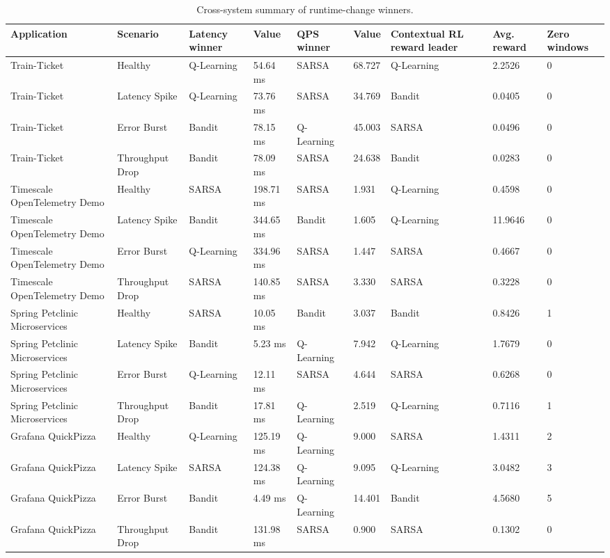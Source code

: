 \documentclass[10pt,twocolumn]{article}
\begin{document}
\begin{table}[t]
\centering
\small
\caption{Cross-system summary of runtime-change winners.}
\begin{tabularx}{\textwidth}{p{2.4cm}p{1.6cm}p{1.8cm}p{1.2cm}p{1.8cm}p{1.0cm}p{2.1cm}p{1.0cm}p{1.0cm}}
\toprule
Application & Scenario & Latency winner & Value & QPS winner & Value & Contextual RL reward leader & Avg. reward & Zero windows \\
\midrule

Train-Ticket & Healthy & Q-Learning & 54.64 ms & SARSA & 68.727 & Q-Learning & 2.2526 & 0 \\
Train-Ticket & Latency Spike & Q-Learning & 73.76 ms & SARSA & 34.769 & Bandit & 0.0405 & 0 \\
Train-Ticket & Error Burst & Bandit & 78.15 ms & Q-Learning & 45.003 & SARSA & 0.0496 & 0 \\
Train-Ticket & Throughput Drop & Bandit & 78.09 ms & SARSA & 24.638 & Bandit & 0.0283 & 0 \\
Timescale OpenTelemetry Demo & Healthy & SARSA & 198.71 ms & SARSA & 1.931 & Q-Learning & 0.4598 & 0 \\
Timescale OpenTelemetry Demo & Latency Spike & Bandit & 344.65 ms & Bandit & 1.605 & Q-Learning & 11.9646 & 0 \\
Timescale OpenTelemetry Demo & Error Burst & Q-Learning & 334.96 ms & SARSA & 1.447 & SARSA & 0.4667 & 0 \\
Timescale OpenTelemetry Demo & Throughput Drop & SARSA & 140.85 ms & SARSA & 3.330 & SARSA & 0.3228 & 0 \\
Spring Petclinic Microservices & Healthy & SARSA & 10.05 ms & Bandit & 3.037 & Bandit & 0.8426 & 1 \\
Spring Petclinic Microservices & Latency Spike & Bandit & 5.23 ms & Q-Learning & 7.942 & Q-Learning & 1.7679 & 0 \\
Spring Petclinic Microservices & Error Burst & Q-Learning & 12.11 ms & SARSA & 4.644 & SARSA & 0.6268 & 0 \\
Spring Petclinic Microservices & Throughput Drop & Bandit & 17.81 ms & Q-Learning & 2.519 & Q-Learning & 0.7116 & 1 \\
Grafana QuickPizza & Healthy & Q-Learning & 125.19 ms & Q-Learning & 9.000 & SARSA & 1.4311 & 2 \\
Grafana QuickPizza & Latency Spike & SARSA & 124.38 ms & Q-Learning & 9.095 & Q-Learning & 3.0482 & 3 \\
Grafana QuickPizza & Error Burst & Bandit & 4.49 ms & Q-Learning & 14.401 & Bandit & 4.5680 & 5 \\
Grafana QuickPizza & Throughput Drop & Bandit & 131.98 ms & SARSA & 0.900 & SARSA & 0.1302 & 0 \\
\bottomrule
\end{tabularx}
\end{table}
\end{document}
